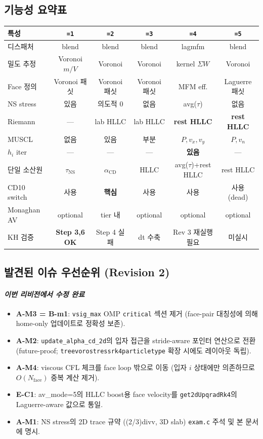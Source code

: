 \documentclass[11pt]{article}
\begin{document}
\subsection{기능성 요약표}

\begin{longtable}{l c c c c c}
\toprule
특성 & \texttt{=1} & \texttt{=2} & \texttt{=3} & \texttt{=4} & \texttt{=5} \\
\midrule
\endhead
디스패처 & blend & blend & blend & lagmfm & blend \\
밀도 추정 & Voronoi $m/V$ & Voronoi & Voronoi & kernel $\Sigma W$ & Voronoi \\
Face 정의 & Voronoi 패싯 & Voronoi 패싯 & Voronoi 패싯 & MFM eff. & Laguerre 패싯 \\
NS stress & 있음 & 의도적 0 & 없음 & avg($\tau$) & 없음 \\
Riemann & --- & lab HLLC & lab HLLC & \textbf{rest HLLC} & \textbf{rest HLLC} \\
MUSCL & 없음 & 있음 & 부분 & $P,v_x,v_y$ & $P,v_n$ \\
$h_i$ iter & --- & --- & --- & \textbf{있음} & --- \\
단일 소산원 & $\tau_\mathrm{NS}$ & $\alpha_\mathrm{CD}$ & HLLC & avg($\tau$)+rest HLLC & rest HLLC \\
CD10 switch & 사용 & \textbf{핵심} & 사용 & 사용 & 사용 (dead) \\
Monaghan AV & optional & tier 내 & optional & optional & optional \\
KH 검증 & \textbf{Step 3,6 OK} & Step 4 실패 & dt 수축 & Rev 3 재실행 필요 & 미실시 \\
\bottomrule
\end{longtable}

\subsection{발견된 이슈 우선순위 (Revision 2)}

\paragraph{\textit{이번 리비전에서 수정 완료}}
\begin{itemize}
  \item \textbf{A-M3 = B-m1}: \texttt{vsig\_max} OMP \texttt{critical} 섹션 제거
        (face-pair 대칭성에 의해 home-only 업데이트로 정확성 보존).
  \item \textbf{A-M2}: \texttt{update\_alpha\_cd\_2d}의 입자 접근을 stride-aware
        포인터 연산으로 전환 (future-proof; \texttt{treevorostressrk4particletype}
        확장 시에도 레이아웃 독립).
  \item \textbf{A-M4}: viscous CFL 체크를 face loop 밖으로 이동
        (입자 $i$ 상태에만 의존하므로 $O(N_\mathrm{face})$ 중복 계산 제거).
  \item \textbf{E-C1}: av\_mode=5의 HLLC boost용 face velocity를
        \texttt{get2dUpqradRk4}의 Laguerre-aware 값으로 통일.
  \item \textbf{A-M1}: NS stress의 2D trace 규약 ((2/3)divv, 3D slab)
        \texttt{exam.c} 주석 및 본 문서에 명시.
\end{itemize}
\end{document}
